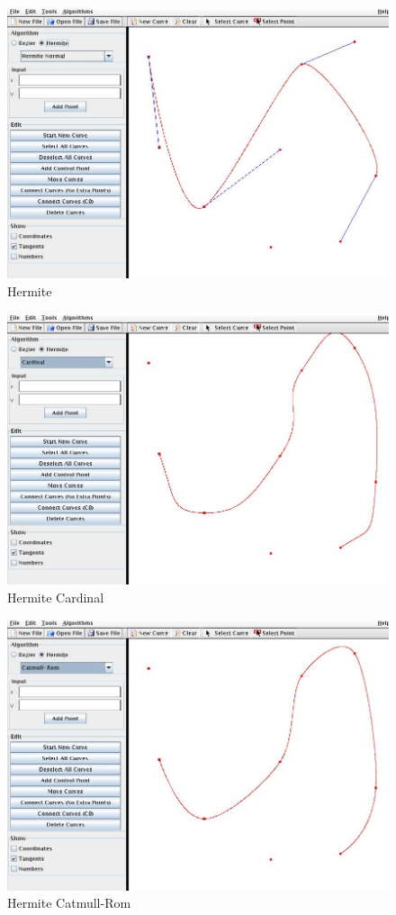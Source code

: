 \documentclass[a4paper,11pt,oneside, titlepage]{article}
\begin{document}
\begin{figure}[htbp]
\centering
\includegraphics[scale=0.4]{./screenies/hermite.jpg}
\caption{Hermite}\label{iH}
\end{figure}
\begin{figure}[htbp]
\centering
\includegraphics[scale=0.4]{./screenies/cardinal.jpg}
\caption{Hermite Cardinal}\label{iHC}
\end{figure}
\begin{figure}[htbp]
\centering
\includegraphics[scale=0.4]{./screenies/catmull.jpg}
\caption{Hermite Catmull-Rom}\label{iHCR}
\end{figure}
\newpage
\end{document}
